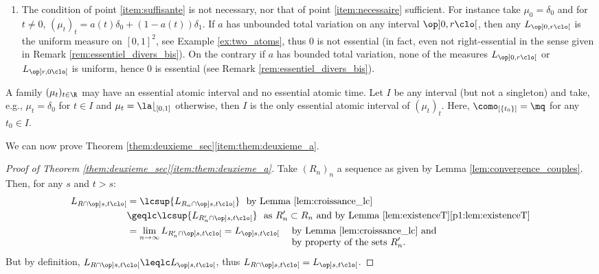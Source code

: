 \begin{rem}
\begin{enumerate}
\item
The condition of point \eqref{item:suffisante} is not necessary, nor that of point \eqref{item:necessaire} sufficient. For instance take $\mu_0=\delta_0$ and for $t\neq0$, $(\mu_t)_t=a(t)\delta_0+(1-a(t))\delta_1$. If $a$ has unbounded total variation on any interval $\op]0,r\clo[$, then any $L_{\op]0,r\clo[}$ is the uniform measure on $[0,1]^2$, see Example \ref{ex:two_atoms}, thus $0$ is not essential (in fact, even not right-essential in the sense given in Remark \ref{rem:essentiel_divers_bis}). On the contrary if $a$ has bounded total variation, none of the measures $L_{\op]0,r\clo[}$ or $L_{\op]r,0\clo[}$ is uniform, hence $0$ is essential (see Remark \ref{rem:essentiel_divers_bis}).
\end{enumerate}
\end{rem}

\begin{ex}\label{ex:intervalle_essentiel}A family $(\mu_t)_{t\in\R}$ may have an essential atomic interval and no essential atomic time. Let $I$ be any interval (but not a singleton) and take, e.g., $\mu_t=\delta_0$ for $t\in I$ and $\mu_t=\la\lfloor_{[0,1]}$ otherwise, then $I$ is the only essential atomic interval of $(\mu_t)_t$. Here, $\como_{[\{t_0\}]}=\mq$ for any $t_0\in I$.
\end{ex}

We can now prove Theorem \ref{them:deuxieme_sec}\eqref{item:them:deuxieme_a}.

\begin{proof}[Proof of Theorem \ref{them:deuxieme_sec}\eqref{item:them:deuxieme_a}]\label{proof:themBa} Take $(R_n)_n$ a sequence as given by Lemma \ref{lem:convergence_couples}. Then, for any $s$ and $t>s$:
\begin{align*}
L_{R\cap\op]s,t\clo[}&=\lcsup\{L_{R_n\cap\op]s,t\clo[}\}\ \ \text{by Lemma \ref{lem:croissance_lc}}\\
&\geqlc\lcsup\{L_{R'_n\cap\op]s,t\clo[}\}\ \ \text{as $R'_n\subset R_n$ and by Lemma \ref{lem:existenceT}\eqref{p1:lem:existenceT}}\\
&=\lim_{n\to\infty}L_{R'_n\cap\op]s,t\clo[}=L_{\op]s,t\clo[}\ \ \text{\begin{tabular}[t]{l}by Lemma \ref{lem:croissance_lc} and\\ by property of the sets $R'_n$.\end{tabular}}
\end{align*}
But by definition, $L_{R\cap\op]s,t\clo[}\leqlc L_{\op]s,t\clo[}$, thus $L_{R\cap\op]s,t\clo[}= L_{\op]s,t\clo[}$.
\end{proof}

